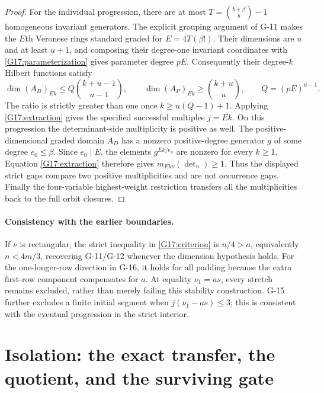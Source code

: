 \documentclass[11pt,a4paper]{article}
\theoremstyle{definition}\newtheorem{definition}{Definition}
\begin{document}
\begin{proof}
For the individual progression, there are at most
$T=\binom{b+\beta}{b}-1$ homogeneous invariant generators.
The explicit grouping argument of G-11 makes the $E$th Veronese
rings standard graded for $E=4T(\beta!)$.
Their dimensions are $u$ and at least $u+1$, and composing their
degree-one invariant coordinates with \eqref{G17:parameterization}
gives parameter degree $pE$. Consequently their degree-$k$ Hilbert
functions satisfy
\[
 \dim(A_D)_{Ek}\leq Q\binom{k+u-1}{u-1},\qquad
 \dim(A_P)_{Ek}\geq\binom{k+u}{u},\qquad Q=(pE)^{u-1}.
\]
The ratio is strictly greater than one once
$k\geq u(Q-1)+1$. Applying \eqref{G17:extraction} gives the
specified successful multiples $j=Ek$.
On this progression the determinant-side multiplicity is positive as
well. The positive-dimensional graded domain $A_D$ has a nonzero
positive-degree generator $g$ of some degree $e_0\leq\beta$.
Since $e_0\mid E$, the elements $g^{Ek/e_0}$ are nonzero for every
$k\geq1$. Equation \eqref{G17:extraction} therefore gives
$m_{Ek\nu}(\det_n)\geq1$. Thus the displayed strict gaps compare
two positive multiplicities and are not occurrence gaps.
Finally the four-variable highest-weight restriction transfers
all the multiplicities back to the full orbit closures.
\end{proof}

\paragraph{Consistency with the earlier boundaries.}
If $\nu$ is rectangular, the strict inequality in
\eqref{G17:criterion} is $n/4>a$, equivalently $n<4m/3$,
recovering G-11/G-12 whenever the dimension hypothesis holds.
For the one-longer-row direction in G-16, it holds for all padding
because the extra first-row component compensates for $a$.
At equality $\nu_1=as$, every stretch remains excluded, rather
than merely failing this stability construction.
G-15 further excludes a finite initial segment when
$j(\nu_1-as)\leq3$; this is consistent with the eventual
progression in the strict interior.




\section{Isolation: the exact transfer, the quotient, and the surviving gate}
\label{sec:isolation-track}
\end{document}
